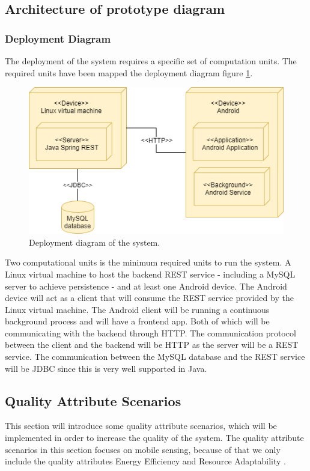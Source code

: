 \subsection{Architecture of prototype diagram}
\subsubsection{Deployment Diagram}
The deployment of the system requires a specific set of computation units. The required units have been mapped the deployment diagram figure \ref{fig:deployment_diagram}.

\begin{figure}[hbt]
\centering
\includegraphics[width=.8\textwidth]{images/Deployment_diagram}
\caption{Deployment diagram of the system.} \label{fig:deployment_diagram}
\end{figure}

Two computational units is the minimum required units to run the system. A Linux virtual machine to host the backend REST service - including a MySQL server to achieve persistence - and at least one Android device. The Android device will act as a client that will consume the REST service provided by the Linux virtual machine. The Android client will be running a continuous background process and will have a frontend app. Both of which will be communicating with the backend through HTTP. The communication protocol between the client and the backend will be HTTP as the server will be a REST service. The communication between the MySQL database and the REST service will be JDBC since this is very well supported in Java.

\subsection{Quality Attribute Scenarios}
This section will introduce some quality attribute scenarios, which will be implemented in order to increase the quality of the system. The quality attribute scenarios in this section focuses on mobile sensing, because of that we only include the quality attributes Energy Efficiency and Resource Adaptability \cite{Kjaergaard2015}.

